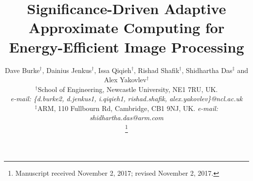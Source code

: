 \documentclass[journal]{IEEEtran}
\begin{document}
%
\title{Significance-Driven Adaptive Approximate Computing for Energy-Efficient Image Processing}
%
%
%

\author{Dave Burke$^\dagger$, Dainius Jenkus$^\dagger$, Issa Qiqieh$^\dagger$, Rishad Shafik$^\dagger$, Shidhartha Das$^\ddagger$ and Alex Yakovlev$^\dagger$\\
\normalsize{$^\dagger$School of Engineering, Newcastle University, NE1 7RU, UK.\\
\small{\textit{e-mail: \{d.burke2, d.jenkus1, i.qiqieh1, rishad.shafik, alex.yakovlev\}@ncl.ac.uk}}}\\
\normalsize{$^\ddagger$ARM, 110 Fullbourn Rd, Cambridge, CB1 9NJ, UK. \small{\textit {e-mail: shidhartha.das@arm.com}}}
        
\thanks{Manuscript received November 2, 2017; revised November 2, 2017.}
}

% 
%
\end{document}
